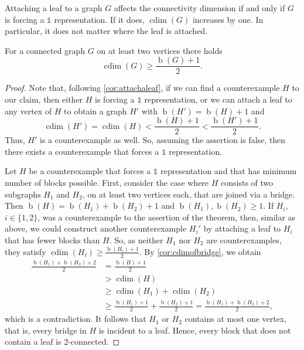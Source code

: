\documentclass[10pt,a4paper]{amsart}
\DeclareMathOperator{\blocks}{\text{$b$}}
\DeclareMathOperator{\cdim}{cdim}
\begin{document}
\begin{corollary}\label{cor:attachaleaf}
    Attaching a leaf to a graph $G$ affects the connectivity dimension if and only if $G$ is forcing a $\mathds{1}$ representation.
    If it does, $\cdim(G)$ increases by one.
    In particular, it does not matter where the leaf is attached.
\end{corollary}

\begin{theorem}\label{thm:cdimblocksratio}
    For a connected graph $G$ on at least two vertices there holds 
    \begin{equation*}
        \cdim(G)\geq\frac{\blocks(G)+1}{2}.   
    \end{equation*}
\end{theorem}

\begin{proof}
    Note that, following \cref{cor:attachaleaf}, if we can find a counterexample $H$ to our claim, then either $H$ is forcing a $\mathds{1}$ representation, or we can attach a leaf to any vertex of $H$ to obtain a graph $H'$ with $\blocks(H')=\blocks(H)+1$ and
    \begin{equation*}
        \cdim(H')=\cdim(H)<\frac{\blocks(H)+1}{2}<\frac{\blocks(H')+1}{2}.
    \end{equation*}
    Thus, $H'$ is a counterexample as well.
    So, assuming the assertion is false, then there exists a counterexample that forces a $\mathds{1}$ representation.
    
    Let $H$ be a counterexample that forces a $\mathds{1}$ representation and that has minimum number of blocks possible.
    First, consider the case where $H$ consists of two subgraphs $H_1$ and $H_2$, on at least two vertices each, that are joined via a bridge.
    Then $\blocks(H)=\blocks(H_1)+\blocks(H_2)+1$ and $\blocks(H_1),\blocks(H_2)\geq1$.
    If $H_i$, $i\in\{1,2\}$, was a counterexample to the assertion of the theorem, then, similar as above, we could construct another counterexample $H_i'$ by attaching a leaf to $H_i$ that has fewer blocks than $H$.
    So, as neither $H_1$ nor $H_2$ are counterexamples, they satisfy $\cdim(H_i)\geq\frac{\blocks(H_i)+1}{2}$.
    By \cref{cor:cdimofbridge}, we obtain
    \begin{align*}
    \frac{\blocks(H_1)+\blocks(H_2)+2}{2} &= \frac{\blocks(H)+1}{2} \\[0.5ex]
    &>\cdim(H) \\[1.5ex]
    &\geq\cdim(H_1)+\cdim(H_2)\\[0.5ex]
    &\geq\frac{\blocks(H_1)+1}{2}+\frac{\blocks(H_2)+1}{2}=\frac{\blocks(H_1)+\blocks(H_2)+2}{2},
    \end{align*}
    which is a contradiction.
    It follows that $H_1$ or $H_2$ contains at most one vertex, that is, every bridge in $H$ is incident to a leaf.
    Hence, every block that does not contain a leaf is \mbox{$2$-connected}.
 

\end{proof}
\end{document}
